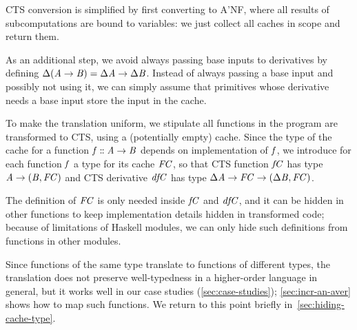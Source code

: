 CTS conversion is simplified by first converting to A'NF, where all results of
subcomputations are bound to variables: we just collect all caches in scope and
return them.

As an additional step, we avoid always passing base inputs to derivatives by
defining \ensuremath{\Delta (\Conid{A}\to \Conid{B})\mathrel{=}\Delta \Conid{A}\to \Delta \Conid{B}}.
Instead of always passing a base input and possibly not using it, we can simply
assume that primitives whose derivative needs a base input store the input in
the cache.

To make the translation uniform, we stipulate all functions in the program are
transformed to CTS, using a (potentially empty) cache. Since the
type of the cache for a function \ensuremath{\Varid{f}\mathrel{:\mkern-1mu:}\Conid{A}\to \Conid{B}} depends on implementation of \ensuremath{\Varid{f}}, we
introduce for each function \ensuremath{\Varid{f}} a type for its cache \ensuremath{\Conid{FC}}, so that CTS function
\ensuremath{\Varid{fC}} has type \ensuremath{\Conid{A}\to (\Conid{B},\Conid{FC})} and CTS derivative \ensuremath{\Varid{dfC}} has type \ensuremath{\Delta \Conid{A}\to \Conid{FC}\to (\Delta \Conid{B},\Conid{FC})}.

The definition of \ensuremath{\Conid{FC}} is only needed inside \ensuremath{\Varid{fC}} and \ensuremath{\Varid{dfC}}, and it can be
hidden in other functions to keep implementation details hidden in transformed
code; because of limitations of Haskell modules, we can only hide such
definitions from functions in other modules.

Since functions of the same type translate to functions of different types, the
translation does not preserve well-typedness in a higher-order language in
general, but it works well in our case studies
(\cref{sec:case-studies}); \cref{sec:incr-an-aver} shows how to map such functions. We
return to this point briefly in~\cref{sec:hiding-cache-type}.

